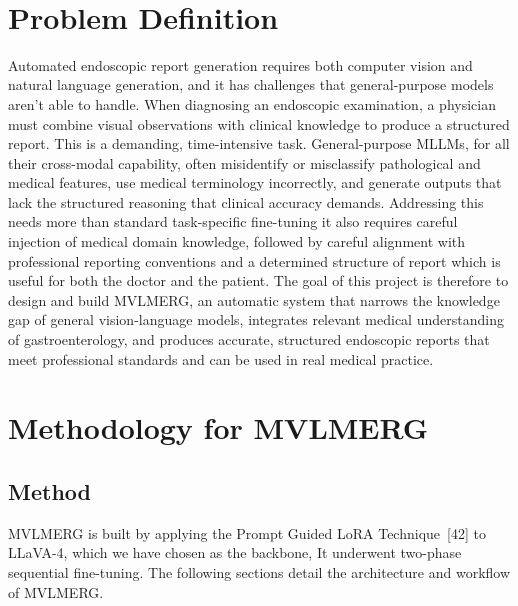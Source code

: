 ﻿﻿\documentclass[12pt]{report}
\begin{document}
\chapter{Problem Definition}
Automated endoscopic report generation requires both computer vision and natural language generation, and it has challenges that general-purpose models aren't able to handle. When diagnosing an endoscopic examination, a physician must combine visual observations with clinical knowledge to produce a structured report. This is a demanding, time-intensive task. General-purpose MLLMs, for all their cross-modal capability, often misidentify or misclassify pathological and medical features, use medical terminology incorrectly, and generate outputs that lack the structured reasoning that clinical accuracy demands. Addressing this needs more than standard task-specific fine-tuning it also requires careful injection of medical domain knowledge, followed by careful alignment with professional reporting conventions and a determined structure of report which is useful for both the doctor and the patient. The goal of this project is therefore to design and build MVLMERG, an automatic system that narrows the knowledge gap of general vision-language models, integrates relevant medical understanding of gastroenterology, and produces accurate, structured endoscopic reports that meet professional standards and can be used in real medical practice.

\chapter{Methodology for MVLMERG}
\section{Method}
MVLMERG is built by applying the Prompt Guided LoRA Technique~[42] to LLaVA-4, which we have chosen as the backbone, It underwent two-phase sequential fine-tuning. The following sections detail the architecture and workflow of MVLMERG.
\end{document}
